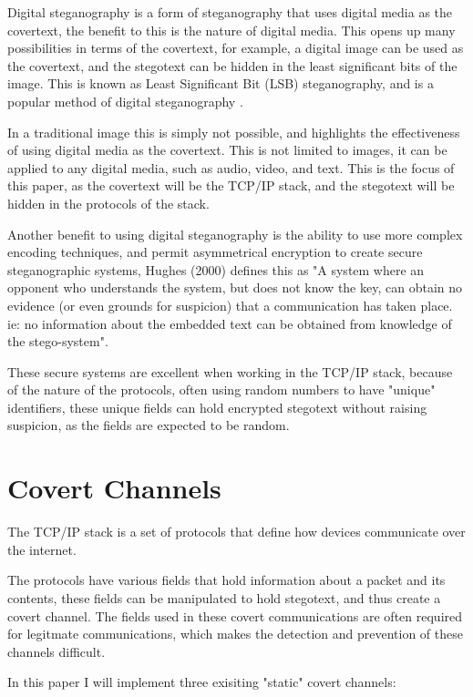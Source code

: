 Digital steganography is a form of steganography that uses digital media as the covertext, the benefit to this is the nature of digital media. This opens up many possibilities in terms of the covertext, for example, a digital image can be used as the covertext, and the stegotext can be hidden in the least significant bits of the image. This is known as Least Significant Bit (LSB) steganography, and is a popular method of digital steganography \cite{AESTfHD}.

In a traditional image this is simply not possible, and highlights the effectiveness of using digital media as the covertext. This is not limited to images, it can be applied to any digital media, such as audio, video, and text. This is the focus of this paper, as the covertext will be the TCP/IP stack, and the stegotext will be hidden in the protocols of the stack.

Another benefit to using digital steganography is the ability to use more complex encoding techniques, and permit asymmetrical encryption to create secure steganographic systems, Hughes (2000) \cite{SaW} defines this as "A system where an opponent who understands the system, but does not know the key, can obtain no evidence (or even grounds for suspicion) that a communication has taken place. ie: no information about the embedded text can be obtained from knowledge of the stego-system".

These secure systems are excellent when working in the TCP/IP stack, because of the nature of the protocols, often using random numbers to have "unique" identifiers, these unique fields can hold encrypted stegotext without raising suspicion, as the fields are expected to be random.

\section{Covert Channels}

The TCP/IP stack is a set of protocols that define how devices communicate over the internet.

The protocols have various fields that hold information about a packet and its contents, these fields can be manipulated to hold stegotext, and thus create a covert channel. The fields used in these covert communications are often required for legitmate communications, which makes the detection and prevention of these channels difficult.

In this paper I will implement three exisiting "static" covert channels:

